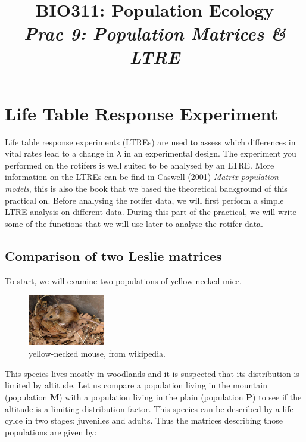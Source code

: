 \documentclass{article}\usepackage[]{graphicx}\usepackage[]{color}
\title{BIO311: Population Ecology\\ \textit{Prac 9: Population Matrices \& LTRE}}
\begin{document}




\maketitle
\tableofcontents
\vspace{3cm}
\newpage

\section{Life Table Response Experiment}
Life table response experiments (LTREs) are used to assess which  differences in vital rates lead to a change in $\lambda$ in an experimental design. The experiment you performed on the rotifers is well suited to be analysed by an LTRE. More information on the LTREs can be find in Caswell (2001) \textit{Matrix population models}, this is also the book that we based the theoretical background of this practical on. Before analysing the rotifer data, we will first perform a simple LTRE analysis on different data. During this part of the practical, we will write some of the functions that we will use later to analyse the rotifer data.

\subsection{Comparison of two Leslie matrices}
To start, we will examine two populations of yellow-necked mice. 

\begin{figure}[h]
\centering
\includegraphics[width=0.3\textwidth]{mouse.jpg}
\caption{\label{fig:mice}yellow-necked mouse, from wikipedia.}
\end{figure}

This species lives mostly in woodlands and it is suspected that its distribution is limited by altitude. Let us compare a population living in the mountain (population $\boldsymbol{M}$) with a population living in the plain (population $\boldsymbol{P}$) to see if the altitude is a limiting distribution factor. This species can be described by a life-cylce in two stages; juveniles and adults. Thus the matrices describing those populations are given by:
\end{document}
